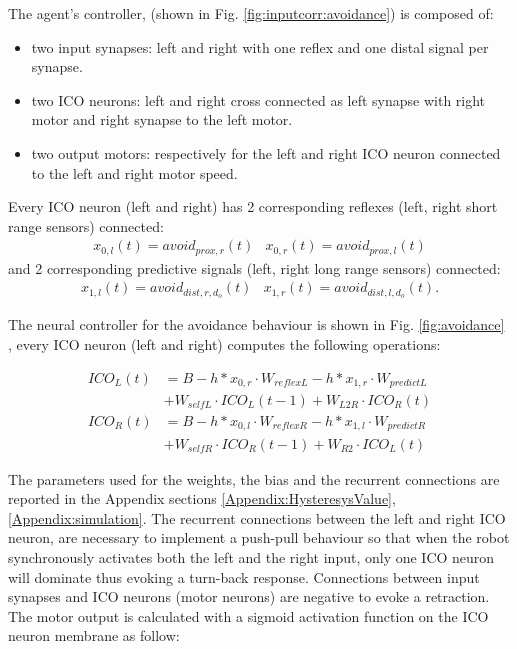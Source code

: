 The agent's controller, (shown in Fig. \ref{fig:inputcorr:avoidance}) is composed of:
\begin{itemize}
\item two input synapses: left and right with one reflex and one distal signal per synapse.
\item two ICO neurons: left and right cross connected as left synapse with right motor and right synapse to the left motor.
\item two output motors: respectively for the left and right ICO neuron connected to the left and right motor speed.
\end{itemize}

Every ICO neuron (left and right) has 2 corresponding reflexes
(left, right short range sensors) connected:
\begin{eqnarray}
x_{0,l}(t)=avoid_{prox,r}(t) & x_{0,r}(t)=avoid_{prox,l}(t)
\end{eqnarray}
and 2 corresponding predictive signals (left, right long range sensors) connected:
\begin{eqnarray}
x_{1,l}(t)=avoid_{dist,r,d_{o}}(t) & x_{1,r}(t)=avoid_{dist,l,d_{o}}(t).
\end{eqnarray}

The neural controller for the avoidance behaviour is shown in
Fig. \ref{fig:avoidance} \citep{Stamm2006}, every ICO neuron (left and right)
computes the following operations:

\begin{eqnarray}
ICO_{L}(t)&=B-h \ast x_{0,r} \cdot W_{reflexL}-h \ast x_{1,r}\cdot W_{predictL}\\ \nonumber
	  &+W_{selfL}\cdot ICO_{L}(t-1) + W_{L2R}\cdot ICO_{R}(t) \label{eq:input:ICO:L1} \\ 
ICO_{R}(t)&=B-h \ast x_{0,l}\cdot W_{reflexR}-h \ast x_{1,l}\cdot W_{predictR}\\ \nonumber
	  &+W_{selfR}\cdot ICO_{R}(t-1) + W_{R2}\cdot ICO_{L}(t)  \label{eq:input:ICO:R1}
\end{eqnarray}

The parameters used for the weights, the bias and the recurrent connections are
reported in the Appendix sections \ref{Appendix:HysteresysValue},\ref{Appendix:simulation}.
The recurrent connections between the left and right ICO neuron, are necessary
to implement a push-pull behaviour so that when the robot synchronously activates
both the left and the right input, only one ICO neuron will dominate thus evoking
a turn-back response. 
Connections between input synapses and ICO neurons (motor neurons) are
negative to evoke a retraction. 
The motor output is calculated with a sigmoid activation function on the ICO neuron
membrane as follow:


